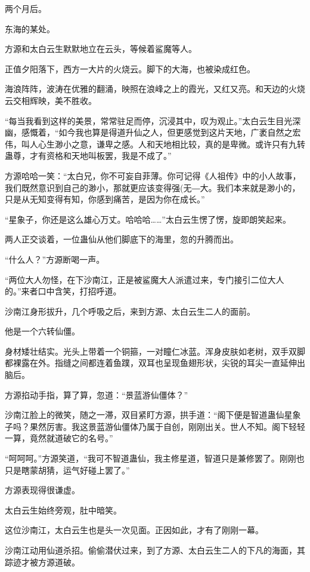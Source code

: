 
\begin{this_body}

两个月后。

东海的某处。

方源和太白云生默默地立在云头，等候着鲨魔等人。

正值夕阳落下，西方一大片的火烧云。脚下的大海，也被染成红色。

海浪阵阵，波涛在优雅的翻涌，映照在浪峰之上的霞光，又红又亮。和天边的火烧云交相辉映，美不胜收。

“每当我看到这样的美景，常常驻足而停，沉浸其中，叹为观止。”太白云生目光深幽，感慨着，“如今我也算是得道升仙之人，但更感觉到这片天地，广袤自然之宏伟，叫人心生渺小之意，谦卑之感。人和天地相比较，真的是卑微。或许只有九转蛊尊，才有资格和天地叫板罢，我是不成了。”

方源哈哈一笑：“太白兄，你不可妄自菲薄。你可记得《人祖传》中的小人故事，我们既然意识到自己的渺小，那就更应该变得强(无―大。我们本来就是渺小的，只是从无知变得有知，你感到痛苦，是因为你在成长。”

“星象子，你还是这么雄心万丈。哈哈哈……”太白云生愣了愣，旋即朗笑起来。

两人正交谈着，一位蛊仙从他们脚底下的海里，忽的升腾而出。

“什么人？”方源断喝一声。

“两位大人勿怪，在下沙南江，正是被鲨魔大人派遣过来，专门接引二位大人的。”来者口中含笑，打招呼道。

沙南江身形拔升，几个呼吸之后，来到方源、太白云生二人的面前。

他是一个六转仙僵。

身材矮壮结实。光头上带着一个铜箍，一对瞳仁冰蓝。浑身皮肤如老树，双手双脚都裸露在外。指缝之间都连着鱼蹼，双耳也呈现鱼翅形状，尖锐的耳尖一直延伸出脑后。

方源掐动手指，算了算，忽道：“景蓝游仙僵体？”

沙南江脸上的微笑，随之一滞，双目紧盯方源，拱手道：“阁下便是智道蛊仙星象子吗？果然厉害。我这景蓝游仙僵体乃属于自创，刚刚出关。世人不知。阁下轻轻一算，竟然就道破它的名号。”

“呵呵呵。”方源笑道，“我可不智道蛊仙，我主修星道，智道只是兼修罢了。刚刚也只是瞎蒙胡猜，运气好碰上罢了。”

方源表现得很谦虚。

太白云生始终旁观，肚中暗笑。

这位沙南江，太白云生也是头一次见面。正因如此，才有了刚刚一幕。

沙南江动用仙道杀招。偷偷潜伏过来，到了方源、太白云生二人的下凡的海面，其踪迹才被方源道破。


\end{this_body}
